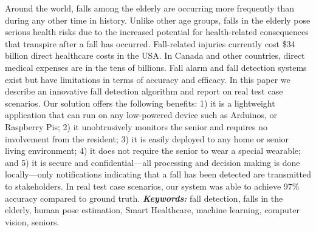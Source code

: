 Around the world, falls among the elderly are occurring more frequently than during any other time in history. Unlike other age groups, falls in the elderly pose serious health risks due to the increased potential for health-related consequences that transpire after a fall has occurred. Fall-related injuries currently cost \$34 billion direct healthcare costs in the USA. In Canada and other countries, direct medical expenses are in the tens of billions. Fall alarm and fall detection systems exist but have limitations in terms of accuracy and efficacy. In this paper we describe an innovative fall detection algorithm and report on real test case scenarios. Our solution offers the following benefits: 1) it is a lightweight application that can run on any low-powered device such as Arduinos, or Raspberry Pis; 2) it unobtrusively monitors the senior and requires no involvement from the resident; 3) it is easily deployed to any home or senior living environment; 4) it does not require the senior to wear a special wearable; and 5) it is secure and confidential—all  processing and decision making is done locally—only notifications indicating that a fall has been detected are transmitted to stakeholders. In real test case scenarios, our system was able to achieve 97\% accuracy compared to ground truth.
    \linebreak
    \linebreak
    \textbf{\emph{Keywords:}}  fall detection, falls in the elderly, human pose estimation, Smart Healthcare, machine learning, computer vision, seniors.
